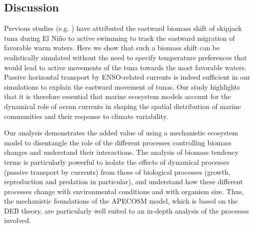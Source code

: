 \subsection{Discussion}

Previous studies (e.g. \citealp{lehodeyNinoSouthernOscillation1997, lehodeyPelagicEcosystemTropical2001}) have attributed the eastward biomass shift of skipjack tuna during El Niño to active swimming to track the eastward migration of favorable warm waters. Here we show that such a biomass shift can be realistically simulated without the need to specify temperature preferences that would lead to active movements of the tuna towards the most favorable waters. Passive horizontal transport by ENSO-related currents is indeed sufficient in our simulations to explain the eastward movement of tunas. Our study highlights that it is therefore essential that marine ecosystem models account for the dynamical role of ocean currents in shaping the spatial distribution of marine communities and their response to climate variability.

Our analysis demonstrates the added value of using a mechanistic ecosystem model to disentangle the role of the different processes controlling biomass changes and understand their interactions. The analysis of biomass tendency terms is particularly powerful to isolate the effects of dynamical processes (passive transport by currents) from those of biological processes (growth, reproduction and predation in particular), and understand how these different processes change with environmental conditions and with organism size. Thus, the mechanistic foundations of the APECOSM model, which is based on the DEB theory, are particularly well suited to an in-depth analysis of the processes involved.


